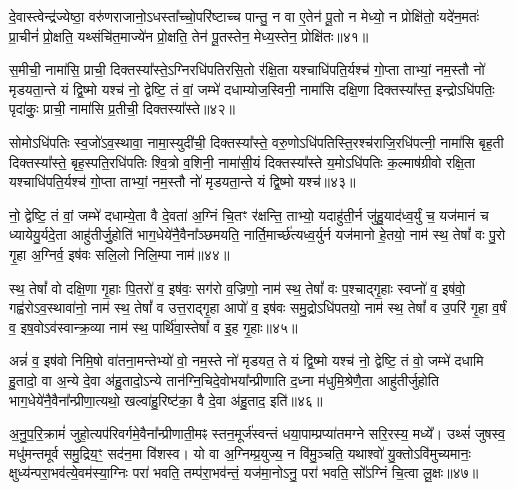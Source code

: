 दे॒वास्त्वेन्द्र॑ज्येष्ठा॒ वरु॑णराजानो॒\-ऽधस्ता᳚च्चो॒परि॑ष्टाच्च पान्तु॒ न वा ए॒तेन॑ पू॒तो न मेध्यो॒ न प्रोक्षि॑तो॒ यदे॑न॒मतः॑ प्रा॒चीनं॑ प्रो॒क्षति॒ यथ्संचि॑त॒माज्ये॑न प्रो॒क्षति॒ तेन॑ पू॒तस्तेन॒ मेध्य॒स्तेन॒ प्रोक्षि॑तः॥४१॥

{\anuvakamend[{दु॒ध्रस्त॒नूर्\mbox{}ह॒विर्भा॑गाः पातु॒ द्वात्रिꣳ॑शच्च॥९॥}]}

स॒मीची॒ नामा॑सि॒ प्राची॒ दिक्तस्या᳚स्ते॒\-ऽग्निरधि॑पतिरसि॒तो र॑क्षि॒ता यश्चाधि॑पति॒र्यश्च॑ गो॒प्ता ताभ्यां॒ नम॒स्तौ नो॑ मृडयता॒न्ते यं द्वि॒ष्मो यश्च॑ नो॒ द्वेष्टि॒ तं वां॒ जम्भे॑ दधाम्योज॒स्विनी॒ नामा॑सि दक्षि॒णा दिक्तस्या᳚स्त॒ इन्द्रो\-ऽधि॑पतिः॒ पृदा॑कुः॒ प्राची॒ नामा॑सि प्र॒तीची॒ दिक्तस्या᳚स्ते॥४२॥

सोमो\-ऽधि॑पतिः स्व॒जो॑\-ऽव॒स्थावा॒ नामा॒स्युदी॑ची॒ दिक्तस्या᳚स्ते॒ वरु॒णो\-ऽधि॑पतिस्ति॒रश्च॑राजि॒रधि॑पत्नी॒ नामा॑सि बृह॒ती दिक्तस्या᳚स्ते॒ बृह॒स्पति॒रधि॑पतिः श्वि॒त्रो व॒शिनी॒ नामा॑सी॒यं दिक्तस्या᳚स्ते य॒मो\-ऽधि॑पतिः क॒ल्माष॑ग्रीवो रक्षि॒ता यश्चाधि॑पति॒र्यश्च॑ गो॒प्ता ताभ्यां॒ नम॒स्तौ नो॑ मृडयता॒न्ते यं द्वि॒ष्मो यश्च॑॥४३॥

नो॒ द्वेष्टि॒ तं वां॒ जम्भे॑ दधाम्ये॒ता वै दे॒वता॑ अ॒ग्निं चि॒तꣳ र॑क्षन्ति॒ ताभ्यो॒ यदाहु॑ती॒र्न जु॑हु॒याद॑ध्व॒र्युं च॒ यज॑मानं च ध्यायेयु॒र्यदे॒ता आहु॑तीर्जु॒होति॑ भाग॒धेये॑नै॒वैना᳚ञ्छमयति॒ नार्ति॒मार्च्छ॑त्यध्व॒र्युर्न यज॑मानो हे॒तयो॒ नाम॑ स्थ॒ तेषां᳚ वः पु॒रो गृ॒हा अ॒ग्निर्व॒ इष॑वः सलि॒लो निलि॒म्पा नाम॑॥४४॥

स्थ॒ तेषां᳚ वो दक्षि॒णा गृ॒हाः पि॒तरो॑ व॒ इष॑वः॒ सग॑रो व॒ज्रिणो॒ नाम॑ स्थ॒ तेषां᳚ वः प॒श्चाद्गृ॒हाः स्वप्नो॑ व॒ इष॑वो॒ गह्व॑रो\-ऽव॒स्थावा॑नो॒ नाम॑ स्थ॒ तेषां᳚ व उत्त॒राद्गृ॒हा आपो॑ व॒ इष॑वः समु॒द्रो\-ऽधि॑पतयो॒ नाम॑ स्थ॒ तेषां᳚ व उ॒परि॑ गृ॒हा व॒र्\mbox{}षं व॒ इष॒वो\-ऽव॑स्वान्क्र॒व्या नाम॑ स्थ॒ पार्थि॑वा॒स्तेषां᳚ व इ॒ह गृ॒हाः॥४५॥

अन्नं॑ व॒ इष॑वो निमि॒षो वा॑तना॒मन्तेभ्यो॑ वो॒ नम॒स्ते नो॑ मृडयत॒ ते यं द्वि॒ष्मो यश्च॑ नो॒ द्वेष्टि॒ तं वो॒ जम्भे॑ दधामि हु॒तादो॒ वा अ॒न्ये दे॒वा अ॑हु॒तादो॒\-ऽन्ये तान॑ग्नि॒चिदे॒वोभया᳚न्प्रीणाति द॒ध्ना म॑धुमि॒श्रेणै॒ता आहु॑तीर्जुहोति भाग॒धेये॑नै॒वैना᳚न्प्रीणा॒त्यथो॒ खल्वा॑हु॒रिष्ट॑का॒ वै दे॒वा अ॑हु॒ताद॒ इति॑॥४६॥

अ॒नु॒प॒रि॒क्रामं॑ जुहो॒त्यप॑रिवर्गमे॒वैना᳚न्प्रीणाती॒मꣴ स्तन॒मूर्ज॑स्वन्तं धया॒पाम्प्रप्या॑तमग्ने सरि॒रस्य॒ मध्ये᳚। उथ्सं॑ जुषस्व॒ मधु॑मन्तमूर्व समु॒द्रिय॒ꣳ॒ सद॑न॒मा वि॑शस्व। यो वा अ॒ग्निम्प्र॒युज्य॒ न वि॑मु॒ञ्चति॒ यथाश्वो॑ यु॒क्तो\-ऽवि॑मुच्यमानः॒ क्षुध्य॑न्परा॒भव॑त्ये॒वम॑स्या॒ग्निः परा॑ भवति॒ तम्प॑रा॒भव॑न्तं॒ यज॑मा॒नो\-ऽनु॒ परा॑ भवति॒ सो᳚\-ऽग्निं चि॒त्वा लू॒क्षः॥४७॥

